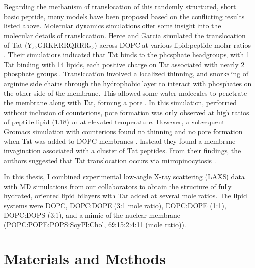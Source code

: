Regarding the mechanism of translocation of this randomly structured, short 
basic peptide, many models have been proposed based on the conflicting results 
listed above. Molecular dynamics simulations offer some insight into the 
molecular details of translocation. Herce and Garcia simulated the 
translocation of Tat (Y$_{47}$GRKKRRQRRR$_{57}$) across DOPC at various 
lipid:peptide molar ratios \cite{Herce07}. Their simulations indicated that Tat 
binds to the phosphate headgroups, with 1 Tat binding with 14 lipids, each 
positive charge on Tat associated with nearly 2 phosphate groups \cite{Herce07}. 
Translocation involved a localized thinning, and snorkeling of arginine side 
chains through the hydrophobic layer to interact with phosphates on
the other side of the membrane. This allowed some water molecules to penetrate 
the membrane along with Tat, forming a pore \cite{Herce07}. In this simulation, 
performed without inclusion of counterions, pore formation was only observed at 
high ratios of peptide:lipid (1:18) or at elevated temperature. However, a 
subsequent Gromacs simulation with counterions found no thinning and no pore 
formation when Tat was added to DOPC membranes \cite{Yesylevskyy09}. Instead they 
found a membrane invagination associated with a cluster of Tat peptides. From 
their findings, the authors suggested that
Tat translocation occurs via micropinocytosis \cite{Yesylevskyy09}. 

In this thesis, I combined experimental low-angle X-ray scattering (\acs{LAXS}) 
data with MD simulations from our collaborators to obtain the structure of fully hydrated, oriented 
lipid bilayers with Tat added at several mole ratios. The lipid systems 
were DOPC, DOPC:DOPE (3:1 mole ratio), DOPC:DOPE (1:1), DOPC:DOPS (3:1), and a 
mimic of the nuclear membrane (POPC:POPE:POPS:SoyPI:Chol, 69:15:2:4:11 (mole ratio)). 

\section{Materials and Methods}
